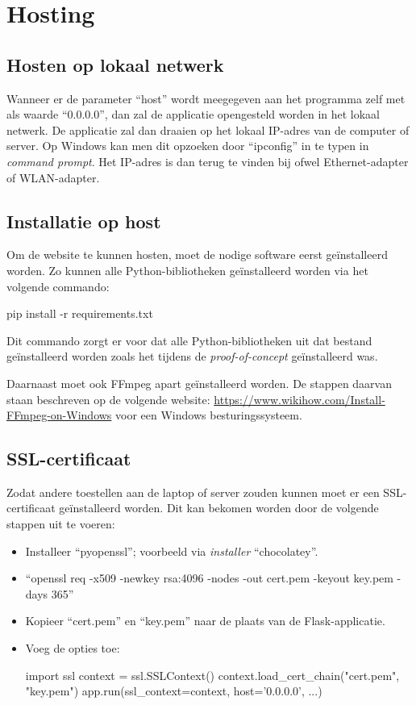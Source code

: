 \section{Hosting}
\subsection{Hosten op lokaal netwerk}
Wanneer er de parameter ``host'' wordt meegegeven aan het programma zelf met als waarde ``0.0.0.0'', dan zal de applicatie opengesteld worden in het lokaal netwerk. De applicatie zal dan draaien op het lokaal IP-adres van de computer of server. Op Windows kan men dit opzoeken door ``ipconfig'' in te typen in \textit{command prompt}. Het IP-adres is dan terug te vinden bij ofwel Ethernet-adapter of WLAN-adapter.

\subsection{Installatie op host}
Om de website te kunnen hosten, moet de nodige software eerst geïnstalleerd worden. Zo kunnen alle Python-bibliotheken geïnstalleerd worden via het volgende commando:
\begin{python}
	pip install -r requirements.txt
\end{python}
Dit commando zorgt er voor dat alle Python-bibliotheken uit dat bestand geïnstalleerd worden zoals het tijdens de \textit{proof-of-concept} geïnstalleerd was.

Daarnaast moet ook FFmpeg apart geïnstalleerd worden. De stappen daarvan staan beschreven op de volgende website: \url{https://www.wikihow.com/Install-FFmpeg-on-Windows} voor een Windows besturingssysteem.

\subsection{SSL-certificaat}
Zodat andere toestellen aan de laptop of server zouden kunnen moet er een SSL-certificaat geïnstalleerd worden. Dit kan bekomen worden door de volgende stappen uit te voeren:
\begin{itemize}
	\item Installeer ``pyopenssl''; voorbeeld via \textit{installer} ``chocolatey''.
	\item ``openssl req -x509 -newkey rsa:4096 -nodes -out cert.pem -keyout key.pem -days 365''
	\item Kopieer ``cert.pem'' en ``key.pem'' naar de plaats van de Flask-applicatie.
	\item Voeg de opties toe:
	\begin{python}
		import ssl
  		context = ssl.SSLContext()
		context.load_cert_chain("cert.pem", "key.pem")
		app.run(ssl_context=context, host='0.0.0.0', ...)
	\end{python}
\end{itemize}

